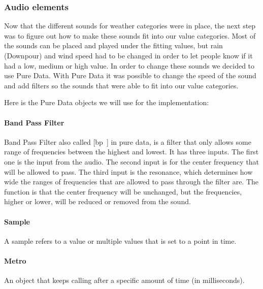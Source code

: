 \subsubsection{Audio elements} %
\label{ssub:audio_elements}

Now that the different sounds for weather categories were in place, the next step was to figure out how to make these sounds fit into our value categories. 
Most of the sounds can be placed and played under the fitting values, but rain (Downpour) and wind speed had to be changed in order to let people know if it had a low, medium or high value.
In order to change these sounds we decided to use Pure Data.
With Pure Data it was possible to change the speed of the sound and add filters so the sounds that were able to fit into our value categories.

Here is the Pure Data objects we will use for the implementation:

\paragraph{Band Pass Filter} %
\label{par:band_pass_filter}

Band Pass Filter also called [bp~] in pure data, is a filter that only allows some range of frequencies between the highest and lowest. 
It has three inputs. 
The first one is the input from the audio. 
The second input is for the center frequency that will be allowed to pass. 
The third input is the resonance, which determines how wide the ranges of frequencies that are allowed to pass through the filter are. 
The function is that the center frequency will be unchanged, but the frequencies, higher or lower, will be reduced or removed from the sound.



\paragraph{Sample} %
\label{par:sample}

A sample refers to a value or multiple values that is set to a point in time.



\paragraph{Metro} %
\label{par:metro}

An object that keeps calling after a specific amount of time (in milliseconds).

